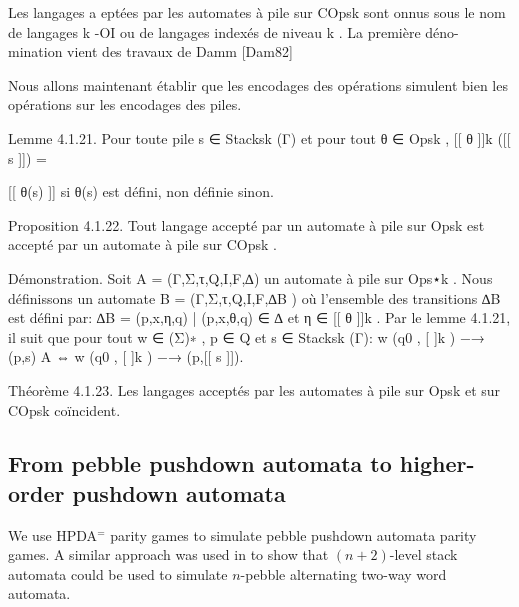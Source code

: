 Les langages a eptées par les automates à pile sur COpsk sont onnus sous
le nom de langages k -OI ou de langages indexés de niveau k . La première déno-
mination vient des travaux de Damm [Dam82]

Nous allons maintenant établir que les encodages des opérations simulent bien
les opérations sur les encodages des piles.

Lemme 4.1.21. Pour toute pile s ∈ Stacksk (Γ) et pour tout θ ∈ Opsk ,
[[ θ ]]k ([[ s ]]) =
{
[[ θ(s) ]]		si θ(s) est défini,	
non définie		sinon.


Proposition 4.1.22. Tout langage accepté par un automate à pile sur Opsk est
accepté par un automate à pile sur COpsk .

Démonstration. Soit A = (Γ,Σ,τ,Q,I,F,∆) un automate à pile sur Ops⋆k . Nous
définissons un automate B = (Γ,Σ,τ,Q,I,F,∆B ) où l'ensemble des transitions ∆B
est défini par:
∆B = {(p,x,η,q) | (p,x,θ,q) ∈ ∆ et η ∈ [[ θ ]]k }.
Par le lemme 4.1.21, il suit que pour tout w ∈ (Σ)∗ , p ∈ Q et s ∈ Stacksk (Γ):
w
(q0 , [ ]k ) −→ (p,s)
A
⇔
w
(q0 , [ ]k ) −→ (p,[[ s ]]).

Théorème 4.1.23. Les langages acceptés par les automates à pile sur Opsk et
sur COpsk coïncident.


\fi




\subsection{From pebble pushdown 
automata 
to higher-order pushdown 
automata
}



We use HPDA$^=$ parity games to simulate pebble pushdown automata
parity games.
A similar approach was used in \cite{carayol2006automates} to show that $(n + 2)$-level stack
automata could be used to simulate $n$-pebble alternating two-way word automata.


}
